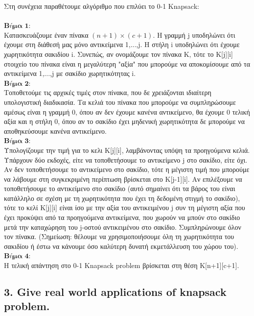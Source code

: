 \documentclass[12pt]{article}
\begin{document}
Στη συνέχεια παραθέτουμε αλγόριθμο που επιλύει το 0-1 Knapsack: \\ \\

\(\textbf{Βήμα 1:}\) \\
Κατασκευάζουμε έναν πίνακα \((n+1) \times (c+1)\). Η γραμμή j υποδηλώνει ότι έχουμε στη διάθεσή μας μόνο αντικείμενα 1,...,j. Η στήλη i υποδηλώνει ότι έχουμε χωρητικότητα σακιδίου i. Συνεπώς, αν ονομάζουμε τον πίνακα Κ, τότε το Κ[j][i] στοιχείο του πίνακα είναι η μεγαλύτερη "αξία" που μπορούμε να αποκομίσουμε από τα αντικείμενα 1,...,j με σακίδιο χωρητικότητας i. \\
\(\textbf{Βήμα 2:}\) \\
Τοποθετούμε τις αρχικές τιμές στον πίνακα, που δε χρειάζονται ιδιαίτερη υπολογιστική διαδικασία. Τα κελιά του πίνακα που μπορούμε να συμπληρώσουμε αμέσως είναι η γραμμή 0, όπου αν δεν έχουμε κανένα αντικείμενο, θα έχουμε 0 τελική αξία και η στήλη 0, όπου αν το σακίδιο έχει μηδενική χωρητικότητα δε μπορούμε να αποθηκεύσουμε κανένα αντικείμενο. \\ 
\(\textbf{Βήμα 3:}\) \\
Υπολογίζουμε την τιμή για το κελι Κ[j][i], λαμβάνοντας υπόψη τα προηγούμενα κελιά. Υπάρχουν δύο εκδοχές, είτε να τοποθετήσουμε το αντικείμενο j στο σακίδιο, είτε όχι. Αν δεν τοποθετήσουμε το αντικείμενο στο σακίδιο, τότε η μέγιστη τιμή που μπορούμε να λάβουμε στη συγκεκριμένη περίπτωση βρίσκεται  στο Κ[j-1][i]. Αν επιλέξουμε να τοποθετήσουμε το αντικείμενο στο σακίδιο (αυτό σημαίνει ότι τα βάρος του είναι κατάλληλο σε σχέση με τη χωρητικότητα που έχει τη δεδομένη στιγμή το σακίδιο), τότε το κελί Κ[j][i] είναι ίσο με την αξία του αντικειμένου j συν τη μέγιστη αξία που έχει προκύψει από τα προηγούμενα αντικείμενα, που χωρούν να μπούν στο σακίδιο μετά την καταχώρηση του j-οστού αντικειμένου στο σακίδιο. Συμπληρώνουμε όλον τον πίνακα. (Σημείωση: θέλουμε να χρησιμοποιήσουμε όλη τη χωρητικότητα του σακιδίου ή έστω να κάνουμε όσο καλύτερη δυνατή εκμετάλλευση του χώρου του).  \\
\(\textbf{Βήμα 4:}\) \\
Η τελική απάντηση στο 0-1 Knapsack problem βρίσκεται στη θέση Κ[n+1][c+1].

\vspace{2in}

\pagebreak

\subsection*{3. Give real world applications of knapsack problem.}
\end{document}
